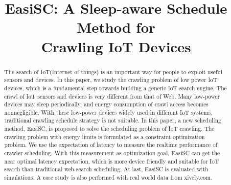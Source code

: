 \documentclass[conference]{IEEEtran}
\begin{document}
%
\title{EasiSC: A Sleep-aware Schedule Method for \\Crawling IoT Devices}

\author{
}

\maketitle


\begin{abstract}
The search of IoT(Internet of things) is an important way for people to exploit useful sensors and devices. In this paper, we study the crawling problem of low power IoT devices, which is a fundamental step towards building a generic IoT search engine.
The crawl of IoT sensors and devices is very different from that of Web. Many low-power devices may sleep periodically, and energy consumption of crawl access becomes nonnegligible.
With these low-power devices widely used in different IoT systems, traditional crawling schedule strategy is not suitable.
In this paper, a new scheduling method, EasiSC, is proposed to solve the scheduling problem of IoT crawling. The crawling problem with energy limits is formulated as a constraint optimization problem. We use the expectation of latency to measure the realtime performance of crawler scheduling. With this measurement as optimization goal, EasiSC can get the near optimal latency expectation, which is more device friendly and suitable for IoT search than traditional web search scheduling.
At last, EasiSC is evaluated with simulations. A case study is also performed with real world data from xively.com.
\end{abstract}
\end{document}
